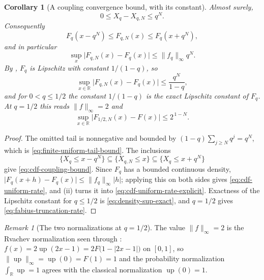 \documentclass[11pt,oneside,openany]{book}
\newtheorem{corollary}[corollary]{Corollary}
\theoremstyle{definition}
\theoremstyle{remark}
\newtheorem{remark}[remark]{Remark}
\newcommand{\R}{\mathbb R}
\newcommand{\abs}[1]{\lvert #1\rvert}
\newcommand{\norm}[1]{\lVert #1\rVert}
\begin{document}
\begin{corollary}[A coupling convergence bound, with its constant]\label{cor:finite-uniform-convergence}
Almost surely,
\begin{equation}\label{eq:finite-uniform-tail-bound}
 0\le X_q-X_{q,N}\le q^N.
\end{equation}
Consequently
\begin{equation}\label{eq:cdf-coupling-bound}
 F_q(x-q^N)\le F_{q,N}(x)\le F_q(x+q^N),
\end{equation}
and in particular
\begin{equation}\label{eq:cdf-uniform-rate}
 \sup_x\abs{F_{q,N}(x)-F_q(x)}\le\norm{f_q}_\infty q^N .
\end{equation}
By , $F_q$ is Lipschitz with constant
$1/(1-q)$, so
\begin{equation}\label{eq:cdf-uniform-rate-explicit}
 \sup_{x\in\R}\abs{F_{q,N}(x)-F_q(x)}\le\frac{q^N}{1-q},
\end{equation}
and for $0<q\le1/2$ the constant $1/(1-q)$ is the exact Lipschitz constant of $F_q$.  At
$q=1/2$ this reads $\norm f_\infty=2$ and
\begin{equation}\label{eq:fabius-truncation-rate}
 \sup_{x\in\R}\abs{F_{1/2,N}(x)-F(x)}\le2^{\,1-N}.
\end{equation}
\end{corollary}

\begin{proof}
The omitted tail is nonnegative and bounded by $(1-q)\sum_{j\ge N}q^j=q^N$, which is
\eqref{eq:finite-uniform-tail-bound}.  The inclusions
\[
 \{X_q\le x-q^N\}\subseteq\{X_{q,N}\le x\}\subseteq\{X_q\le x+q^N\}
\]
give \eqref{eq:cdf-coupling-bound}.  Since $F_q$ has a bounded continuous density,
$\abs{F_q(x+h)-F_q(x)}\le\norm{f_q}_\infty\abs h$; applying this on both sides gives
\eqref{eq:cdf-uniform-rate}, and
(ii) turns it into
\eqref{eq:cdf-uniform-rate-explicit}.  Exactness of the Lipschitz constant for
$q\le1/2$ is \eqref{eq:density-sup-exact}, and $q=1/2$ gives
\eqref{eq:fabius-truncation-rate}.
\end{proof}

\begin{remark}[The two normalizations at $q=1/2$]\label{rem:halfbase-density-normalizations}
The value $\norm f_\infty=2$ is the Rvachev normalization seen through
: $f(x)=2\operatorname{up}(2x-1)=2F\bigl(1-\abs{2x-1}\bigr)$ on
$[0,1]$, so $\norm{\operatorname{up}}_\infty=\operatorname{up}(0)=F(1)=1$ and the
probability normalization $\int_\R\operatorname{up}=1$ agrees with the classical
normalization $\operatorname{up}(0)=1$.
\end{remark}
\end{document}
